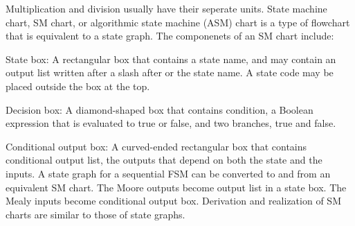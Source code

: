 \documentclass[a4paper,12pt]{report}
\begin{document}
Multiplication and division usually have their seperate units.
State machine chart, SM chart, or algorithmic state machine (ASM) chart is a type of flowchart that is equivalent to a state graph. The componenets of an SM chart include:
\bit
\item State box: A rectangular box that contains a state name, and may contain an output list written after a slash after or the state name. A state code may be placed outside the box at the top.
\item Decision box: A diamond-shaped box that contains condition, a Boolean expression that is evaluated to true or false, and two branches, true and false.
\item Conditional output box: A curved-ended rectangular box that contains conditional output list, the outputs that depend on both the state and the inputs.
\eit
A state graph for a sequential FSM can be converted to and from an equivalent SM chart. The Moore outputs become output list in a state box. The Mealy inputs become conditional output box. Derivation and realization of SM charts are similar to those of state graphs.
\end{document}
